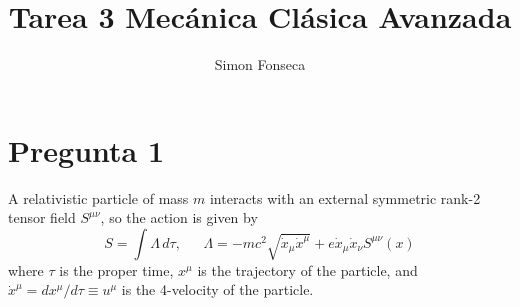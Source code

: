 \documentclass[]{article}
\title{Tarea 3 Mecánica Clásica Avanzada}
\author{Simon Fonseca}
\numberwithin{equation}{section}
\newcommand{\0}{\textcolor{gray}{0}}
\newcommand{\ltd}[2]{d #1/d #2}
\begin{document}
\maketitle
\section{Pregunta 1}
A relativistic particle of mass \(m\) interacts with an external symmetric rank-2 tensor field \(S^{\mu\nu}\), so the action is given by
\begin{equation}
	S = \int \Lambda \, d\tau, ~~~~~~~ \Lambda = -mc^2 \sqrt{\dot{x}_\mu \dot{x}^\mu} + e \dot{x}_\mu \dot{x}_\nu S^{\mu\nu}(x) \label{enunciado}
\end{equation}
where \(\tau\) is the proper time, \(x^\mu\) is the trajectory of the particle, and \(\dot{x}^\mu = \ltd{x^\mu}{\tau} \equiv u^\mu\) is the 4-velocity of the particle.
\end{document}
